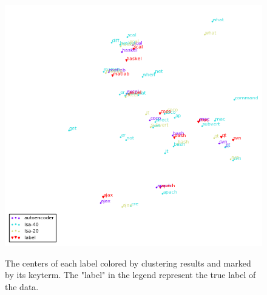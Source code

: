 \documentclass[12pt]{article}
\begin{document}
\begin{figure}
  \centering
  \includegraphics[width=0.9\linewidth]{centers.png}
  \label{center}
  \caption{The centers of each label colored by clustering
  results and marked by its keyterm. The "label" in the
  legend represent the true label of the data.}
\end{figure}
\end{document}
